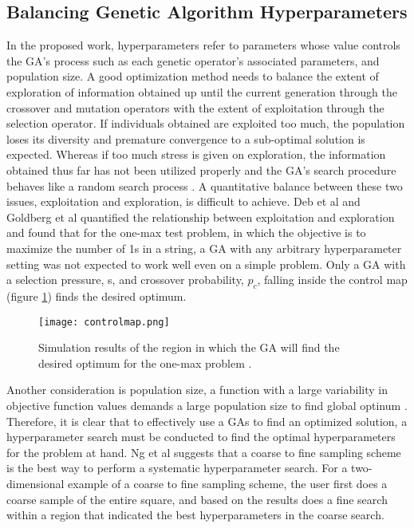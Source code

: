 \subsection{Balancing Genetic Algorithm Hyperparameters}
In the proposed work, hyperparameters refer to parameters whose value controls 
the \gls{GA}'s process such as each genetic operator's associated parameters, and
population size.  
A good optimization method needs to balance the extent of exploration of 
information obtained up until the current generation through the crossover 
and mutation operators with the extent of exploitation through the selection
operator. 
If individuals obtained are exploited too much, the population loses its diversity 
and premature convergence to a sub-optimal solution is expected. 
Whereas if too much stress is given on exploration, the information obtained 
thus far has not been utilized properly and the \gls{GA}'s search procedure 
behaves like a random search process \cite{deb_multi-objective_2001}. 
A quantitative balance between these two issues, exploitation and exploration, 
is difficult to achieve. 
Deb et al \cite{deb_multi-objective_2001} and Goldberg et al 
\cite{goldberg_toward_1993} quantified the relationship between exploitation 
and exploration and found that for the one-max test problem, in which the 
objective is to maximize the number of 1s in a string, a \gls{GA} with any 
arbitrary hyperparameter setting was not expected to work well even on a simple 
problem. 
Only a \gls{GA} with a selection pressure, s, and crossover probability, $p_c$, 
falling inside the control map (figure \ref{fig:controlmap}) finds the desired 
optimum.  


\begin{figure}[H]
    \centering
    \texttt{[image: controlmap.png]} 
    \caption{Simulation results of the region in which the \gls{GA} will find the 
    desired optimum for the one-max problem 
    \cite{goldberg_toward_1993,deb_multi-objective_2001}.}
    \label{fig:controlmap}
\end{figure}

Another consideration is population size, a function with a large variability in 
objective function values demands a large population size to find global 
optinum \cite{deb_multi-objective_2001}. 
Therefore, it is clear that to effectively use a \glspl{GA} to find an optimized 
solution, a hyperparameter search must be conducted to find the optimal 
hyperparameters for the problem at hand. 
Ng et al \cite{ng_improving_2021} suggests that a coarse to fine sampling scheme 
is the best way to perform a systematic hyperparameter search.  
For a two-dimensional example of a coarse to fine sampling scheme, the user 
first does a coarse sample of the entire square, and based on the results does a
fine search within a region that indicated the best hyperparameters in the 
coarse search. 


